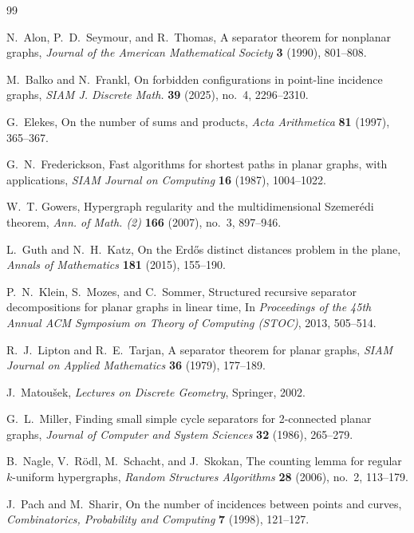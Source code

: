 \documentclass[11pt]{article}
\theoremstyle{plain}
\theoremstyle{definition}
\theoremstyle{remark}
\begin{document}
\begin{thebibliography}{99}

N.~Alon, P.~D.~Seymour, and R.~Thomas,
A separator theorem for nonplanar graphs,
\emph{Journal of the American Mathematical Society} \textbf{3} (1990), 801--808.

M.~Balko and N.~Frankl,
On forbidden configurations in point-line incidence graphs,
\emph{SIAM J. Discrete Math.} \textbf{39} (2025), no.~4, 2296--2310.

G.~Elekes,
On the number of sums and products,
\emph{Acta Arithmetica} \textbf{81} (1997), 365--367.

G.~N.~Frederickson,
Fast algorithms for shortest paths in planar graphs, with applications,
\emph{SIAM Journal on Computing} \textbf{16} (1987), 1004--1022.

W.~T. Gowers,
Hypergraph regularity and the multidimensional Szemer\'edi theorem,
\emph{Ann. of Math. (2)} \textbf{166} (2007), no.~3, 897--946.

L.~Guth and N.~H.~Katz,
On the Erd\H{o}s distinct distances problem in the plane,
\emph{Annals of Mathematics} \textbf{181} (2015), 155--190.

P.~N.~Klein, S.~Mozes, and C.~Sommer,
Structured recursive separator decompositions for planar graphs in linear time,
In \emph{Proceedings of the 45th Annual ACM Symposium on Theory of Computing (STOC)}, 2013, 505--514.

R.~J.~Lipton and R.~E.~Tarjan,
A separator theorem for planar graphs,
\emph{SIAM Journal on Applied Mathematics} \textbf{36} (1979), 177--189.

J.~Matou\v{s}ek,
\emph{Lectures on Discrete Geometry},
Springer, 2002.

G.~L.~Miller,
Finding small simple cycle separators for 2-connected planar graphs,
\emph{Journal of Computer and System Sciences} \textbf{32} (1986), 265--279.

B.~Nagle, V.~R\"odl, M.~Schacht, and J.~Skokan,
The counting lemma for regular \(k\)-uniform hypergraphs,
\emph{Random Structures Algorithms} \textbf{28} (2006), no.~2, 113--179.

J.~Pach and M.~Sharir,
On the number of incidences between points and curves,
\emph{Combinatorics, Probability and Computing} \textbf{7} (1998), 121--127.


\end{thebibliography}
\end{document}
